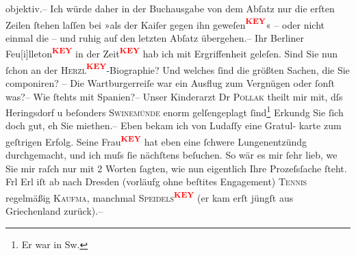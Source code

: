 \begin{ledgroupsized}[t]{13cm}
               objektiv.– Ich würde daher in der Buchausgabe von dem Abſatz nur die erſten Zeilen
               ſtehen laſſen bei »als der Kaiſer gegen ihn
                  geweſen\textcolor{red}{\textsuperscript{\textbf{KEY}}}« – oder nicht einmal die – und ruhig auf den letzten Abſatz
               übergehen.– \pend
           \pstart
           Ihr Berliner Feu{[}i{]}lleton\textcolor{red}{\textsuperscript{\textbf{KEY}}} in der Zeit\textcolor{red}{\textsuperscript{\textbf{KEY}}} hab ich mit Ergriffenheit geleſen. Sind {\pb}Sie nun ſchon an der \textsc{Herzl\textcolor{red}{\textsuperscript{\textbf{KEY}}}}-Biographie? Und welches ſind die größten Sachen, die Sie componiren? – Die Wartburgerreiſe war ein Ausflug zum Vergnügen
               oder ſonſt was?– Wie ſtehts mit Spanien?– Unser
               Kinderarzt Dr \textsc{Pollak} theilt mir mit, dſs Heringsdorf u
               beſonders \textsc{Swinemünde} enorm gelſengeplagt ſind\footnote{\noindent{}Er war in Sw.} Erkundg Sie ſich doch gut, eh Sie miethen.– Eben bekam ich von Ludaſſy eine Gratul- karte zum geſtrigen
               Erfolg. Seine Frau\textcolor{red}{\textsuperscript{\textbf{KEY}}} hat eben eine
               ſchwere Lungenentzündg durchgemacht, und ich muſs ſie nächſtens beſuchen. So wär es
               mir ſehr lieb, {\pb}we{\geminationn} Sie mir raſch nur mit 2 Worten  ſagten, wie nun eigentlich Ihre Prozeſsſache ſteht. \pend
           \pstart
           Frl Erl iſt ab nach Dresden (vorläufg ohne beſti{\geminationm}tes
               Engagement) \textsc{Tennis} regelmäßig \textsc{Kaufma{\geminationn}}, manchmal \textsc{Speidels\textcolor{red}{\textsuperscript{\textbf{KEY}}}} (er kam erſt jüngſt aus Griechenland
               zurück).– \pend

\end{ledgroupsized}
